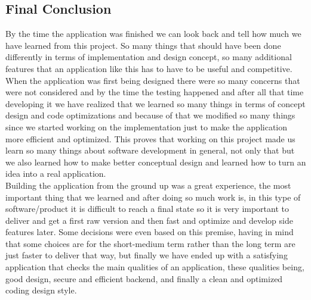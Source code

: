 \begin{center}
    \section*{\huge{Final Conclusion}}
\end{center}
By the time the application was finished we can look back and tell how much we have learned from this project. So many things that should have been done differently in terms of implementation and design concept, so many additional features that an application like this has to have to be useful and competitive. 
\\ When the application was first being designed there were so many concerns that were not considered and by the time the testing happened and after all that time developing it we have realized that we learned so many things in terms of concept design and code optimizations and because of that we modified so many things since we started working on the implementation just to make the application more efficient and optimized. This proves that working on this project made us learn so many things about software development in general, not only that but we also learned how to make better conceptual design and learned how to turn an idea into a real application.
\\ Building the application from the ground up was a great experience, the most important thing that we learned and after doing so much work is, in this type of software/product it is difficult  to reach a final state so it is very important to deliver and get a first raw version and then fast and optimize and develop side features later. Some decisions were even based on this premise, having in mind that some choices are for the short-medium term rather than the long term are just faster to deliver that way, but finally we have ended up with a satisfying application that checks the main qualities of an application, these qualities being, good design, secure and efficient backend, and finally a clean and optimized coding design style. 



